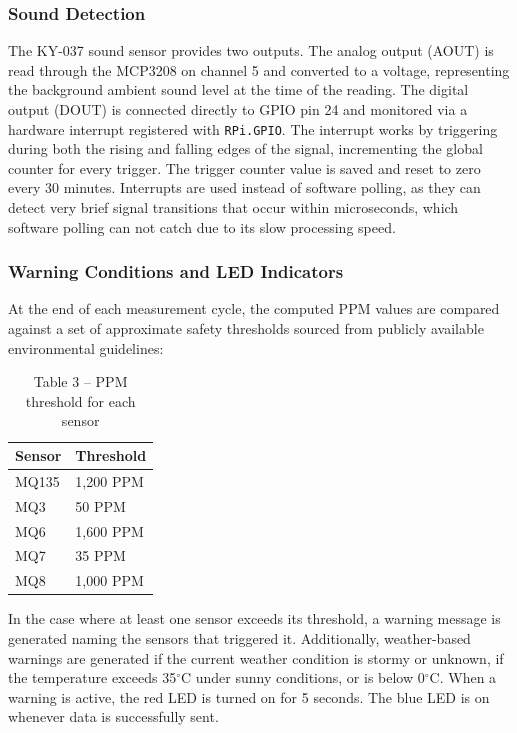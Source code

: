 \subsubsection{Sound Detection}

The KY-037 sound sensor provides two outputs. The analog output (AOUT) is read through the
MCP3208 on channel 5 and converted to a voltage, representing the background ambient sound
level at the time of the reading. The digital output (DOUT) is connected directly to GPIO
pin 24 and monitored via a hardware interrupt registered with \texttt{RPi.GPIO}. The interrupt
works by triggering during both the rising and falling edges of the signal, incrementing the
global counter for every trigger. The trigger counter value is saved and reset to zero every
30 minutes. Interrupts are used instead of software polling, as they can detect very brief
signal transitions that occur within microseconds, which software polling can not catch due to
its slow processing speed.

\subsubsection{Warning Conditions and LED Indicators}

At the end of each measurement cycle, the computed PPM values are compared against a set of
approximate safety thresholds sourced from publicly available environmental guidelines:

\vspace{12pt}
\begin{table}[H]
  \centering
  \caption{Table 3 -- PPM threshold for each sensor}
  \label{tab:ppm-thresholds}
  \renewcommand{\arraystretch}{1.3}
  \begin{tabular}{ll}
    \toprule
    \textbf{Sensor} & \textbf{Threshold} \\
    \midrule
    MQ135 & 1{,}200 PPM \\
    MQ3   & 50 PPM      \\
    MQ6   & 1{,}600 PPM \\
    MQ7   & 35 PPM      \\
    MQ8   & 1{,}000 PPM \\
    \bottomrule
  \end{tabular}
\end{table}
\vspace{12pt}

In the case where at least one sensor exceeds its threshold, a warning message is generated
naming the sensors that triggered it. Additionally, weather-based warnings are generated if the
current weather condition is stormy or unknown, if the temperature exceeds 35$^\circ$C under
sunny conditions, or is below 0$^\circ$C. When a warning is active, the red LED is turned on
for 5 seconds. The blue LED is on whenever data is successfully sent.

